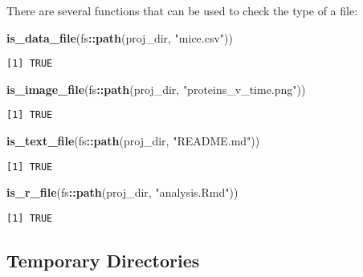 \documentclass[12pt,twoside]{reedthesis}
\newenvironment{Shaded}{\begin{snugshade}}{\end{snugshade}}
\newcommand{\KeywordTok}[1]{\textcolor[rgb]{0.13,0.29,0.53}{\textbf{#1}}}
\newcommand{\StringTok}[1]{\textcolor[rgb]{0.31,0.60,0.02}{#1}}
\newcommand{\OperatorTok}[1]{\textcolor[rgb]{0.81,0.36,0.00}{\textbf{#1}}}
\newcommand{\NormalTok}[1]{#1}
\begin{document}
There are several functions that can be used to check the type of a
file:
\begin{Shaded}
\begin{Highlighting}[]
\KeywordTok{is_data_file}\NormalTok{(fs}\OperatorTok{::}\KeywordTok{path}\NormalTok{(proj_dir, }\StringTok{"mice.csv"}\NormalTok{))}
\end{Highlighting}
\end{Shaded}
\begin{verbatim}
[1] TRUE
\end{verbatim}
\begin{Shaded}
\begin{Highlighting}[]
\KeywordTok{is_image_file}\NormalTok{(fs}\OperatorTok{::}\KeywordTok{path}\NormalTok{(proj_dir, }\StringTok{"proteins_v_time.png"}\NormalTok{))}
\end{Highlighting}
\end{Shaded}
\begin{verbatim}
[1] TRUE
\end{verbatim}
\begin{Shaded}
\begin{Highlighting}[]
\KeywordTok{is_text_file}\NormalTok{(fs}\OperatorTok{::}\KeywordTok{path}\NormalTok{(proj_dir, }\StringTok{"README.md"}\NormalTok{))}
\end{Highlighting}
\end{Shaded}
\begin{verbatim}
[1] TRUE
\end{verbatim}
\begin{Shaded}
\begin{Highlighting}[]
\KeywordTok{is_r_file}\NormalTok{(fs}\OperatorTok{::}\KeywordTok{path}\NormalTok{(proj_dir, }\StringTok{"analysis.Rmd"}\NormalTok{))}
\end{Highlighting}
\end{Shaded}
\begin{verbatim}
[1] TRUE
\end{verbatim}
\subsection{Temporary Directories}\label{temporary-directories}
\end{document}
